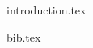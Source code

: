 \documentclass{article}
\begin{document}
{introduction.tex}










\newpage
{bib.tex}
\end{document}
